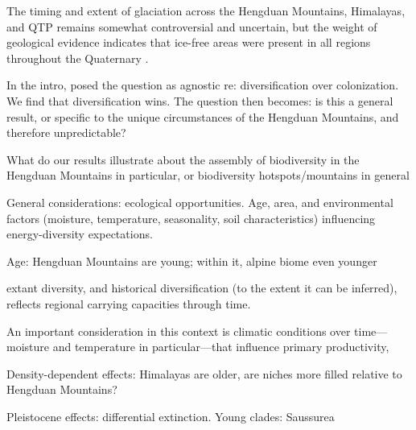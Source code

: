  The timing and extent of glaciation across the Hengduan Mountains, Himalayas, and QTP remains somewhat controversial and uncertain, but the weight of geological evidence indicates that ice-free areas were present in all regions throughout the Quaternary \citep{owen2014}. 





In the intro, posed the question as agnostic re: diversification over colonization. We find that diversification wins. The question then becomes: is this a general result, or specific to the unique circumstances of the Hengduan Mountains, and therefore unpredictable?

What do our results illustrate about the assembly of biodiversity in the Hengduan Mountains in particular, or biodiversity hotspots/mountains in general

General considerations: ecological opportunities. Age, area, and environmental factors (moisture, temperature, seasonality, soil characteristics) influencing energy-diversity expectations.

Age: Hengduan Mountains are young; within it, alpine biome even younger



 extant diversity, and historical diversification (to the extent it can be inferred), reflects regional carrying capacities through time. 

An important consideration in this context is climatic conditions over time---moisture and temperature in particular---that influence primary productivity,  

Density-dependent effects: Himalayas are older, are niches more filled relative to Hengduan Mountains?

Pleistocene effects: differential extinction. Young clades: Saussurea


